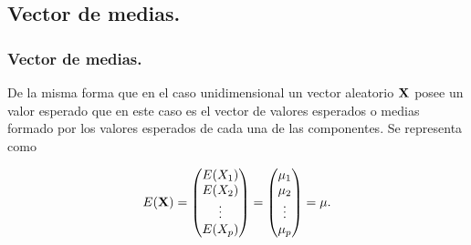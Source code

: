 





 \subsection{Vector de medias.}
\begin{frame}
\frametitle{Vector de medias.}

De la misma forma que en el caso unidimensional un vector aleatorio $\mathbf{X}$ posee un valor esperado que en este caso es el vector de valores esperados o medias formado por los valores esperados de cada una de las componentes. Se representa como 


$$E(\mathbf{X})=\begin{pmatrix}E(X_1)\\ E(X_2)\\ \vdots\\ E(X_p)\end{pmatrix}=
\begin{pmatrix} \mu_1\\ \mu_2\\ \vdots\\ \mu_p\end{pmatrix}=\mathbf{\mu}.$$
\end{frame}


